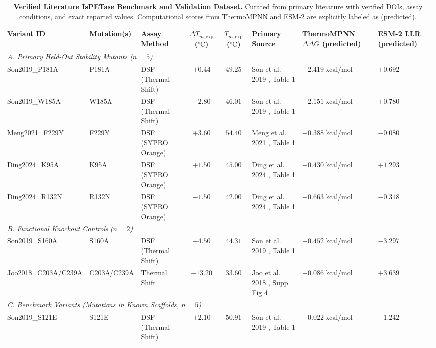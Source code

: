 \documentclass[11pt,a4paper]{article}
\begin{document}
\begin{table}[H]
\centering
\small
\caption{\textbf{Verified Literature IsPETase Benchmark and Validation Dataset.} Curated from primary literature with verified DOIs, assay conditions, and exact reported values. Computational scores from ThermoMPNN and ESM-2 are explicitly labeled as (predicted).}
\label{tab:held_out_benchmark}
\begin{tabularx}{\textwidth}{lllccXll}
\toprule
\textbf{Variant ID} & \textbf{Mutation(s)} & \textbf{Assay Method} & \textbf{$\Delta T_{m, \text{exp}}$ ($^\circ\text{C}$)} & \textbf{$T_{m, \text{exp}}$ ($^\circ\text{C}$)} & \textbf{Primary Source} & \textbf{ThermoMPNN $\Delta\Delta G$ (predicted)} & \textbf{ESM-2 LLR (predicted)} \\
\midrule
\multicolumn{8}{l}{\textit{A. Primary Held-Out Stability Mutants ($n=5$)}} \\
Son2019\_P181A & P181A & DSF (Thermal Shift) & $+0.44$ & $49.25$ & Son et al. 2019 \cite{son2019rational}, Table 1 & $+2.419\text{ kcal/mol}$ & $+0.692$ \\
Son2019\_W185A & W185A & DSF (Thermal Shift) & $-2.80$ & $46.01$ & Son et al. 2019 \cite{son2019rational}, Table 1 & $+2.151\text{ kcal/mol}$ & $+0.780$ \\
Meng2021\_F229Y & F229Y & DSF (SYPRO Orange) & $+3.60$ & $54.40$ & Meng et al. 2021 \cite{meng2021protein}, Table 1 & $+0.388\text{ kcal/mol}$ & $-0.080$ \\
Ding2024\_K95A & K95A & DSF (SYPRO Orange) & $+1.50$ & $45.00$ & Ding et al. 2024 \cite{ding2024modulation}, Table 1 & $-0.430\text{ kcal/mol}$ & $+1.293$ \\
Ding2024\_R132N & R132N & DSF (SYPRO Orange) & $-1.50$ & $42.00$ & Ding et al. 2024 \cite{ding2024modulation}, Table 1 & $+0.663\text{ kcal/mol}$ & $-0.318$ \\
\midrule
\multicolumn{8}{l}{\textit{B. Functional Knockout Controls ($n=2$)}} \\
Son2019\_S160A & S160A & DSF (Thermal Shift) & $-4.50$ & $44.31$ & Son et al. 2019 \cite{son2019rational}, Table 1 & $+0.452\text{ kcal/mol}$ & $-3.297$ \\
Joo2018\_C203A/C239A & C203A/C239A & Thermal Shift & $-13.20$ & $33.60$ & Joo et al. 2018 \cite{joo2018structural}, Supp Fig 4 & $-0.086\text{ kcal/mol}$ & $+3.639$ \\
\midrule
\multicolumn{8}{l}{\textit{C. Benchmark Variants (Mutations in Known Scaffolds, $n=5$)}} \\
Son2019\_S121E & S121E & DSF (Thermal Shift) & $+2.10$ & $50.91$ & Son et al. 2019 \cite{son2019rational}, Table 1 & $+0.022\text{ kcal/mol}$ & $-1.242$ \\

\end{tabularx}
\end{table}
\end{document}
